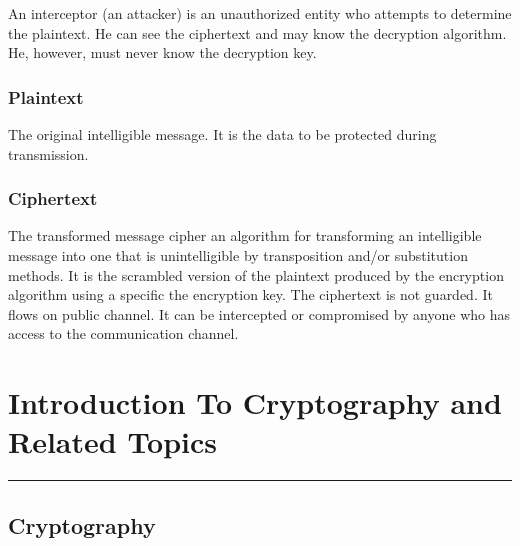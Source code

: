 \documentclass[british]{article}
\begin{document}
An interceptor (an attacker) is an unauthorized entity who attempts
to determine the plaintext. He can see the ciphertext and may know
the decryption algorithm. He, however, must never know the decryption
key.

\subsubsection{Plaintext}

The original intelligible message. It is the data to be protected
during transmission.

\subsubsection{Ciphertext}

The transformed message cipher an algorithm for transforming an intelligible
message into one that is unintelligible by transposition and/or substitution
methods. It is the scrambled version of the plaintext produced by
the encryption algorithm using a specific the encryption key. The
ciphertext is not guarded. It flows on public channel. It can be intercepted
or compromised by anyone who has access to the communication channel.
\begin{center}
\noindent{}
\par\end{center}

\pagebreak{}

\section{Introduction To Cryptography and Related Topics}
\begin{center}
\rule[0.5ex]{450bp}{0.75pt}
\par\end{center}

\subsection{Cryptography}
\end{document}
